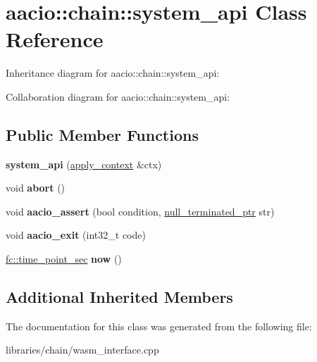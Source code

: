 \hypertarget{classaacio_1_1chain_1_1system__api}{}\section{aacio\+:\+:chain\+:\+:system\+\_\+api Class Reference}
\label{classaacio_1_1chain_1_1system__api}


Inheritance diagram for aacio\+:\+:chain\+:\+:system\+\_\+api\+:


Collaboration diagram for aacio\+:\+:chain\+:\+:system\+\_\+api\+:
\subsection*{Public Member Functions}
\begin{DoxyCompactItemize}
\item 
\mbox{\label{classaacio_1_1chain_1_1system__api_a24eb054d002c5bc73e01820f79ea032e}} 
{\bfseries system\+\_\+api} (\mbox{\hyperlink{classaacio_1_1chain_1_1apply__context}{apply\+\_\+context}} \&ctx)
\item 
\mbox{\label{classaacio_1_1chain_1_1system__api_ae9a02b9b044c0b8ecdbbb6ff7b57ec32}} 
void {\bfseries abort} ()
\item 
\mbox{\label{classaacio_1_1chain_1_1system__api_aa68ca33ae7182a31cfd49f9b86521a94}} 
void {\bfseries aacio\+\_\+assert} (bool condition, \mbox{\hyperlink{structaacio_1_1chain_1_1null__terminated__ptr}{null\+\_\+terminated\+\_\+ptr}} str)
\item 
\mbox{\label{classaacio_1_1chain_1_1system__api_ae962e75b2c05836829f4c7e4a2be97bb}} 
void {\bfseries aacio\+\_\+exit} (int32\+\_\+t code)
\item 
\mbox{\label{classaacio_1_1chain_1_1system__api_ac0d3bdd50f575d87514bd3c8af22d248}} 
\mbox{\hyperlink{classfc_1_1time__point__sec}{fc\+::time\+\_\+point\+\_\+sec}} {\bfseries now} ()
\end{DoxyCompactItemize}
\subsection*{Additional Inherited Members}


The documentation for this class was generated from the following file\+:\begin{DoxyCompactItemize}
\item 
libraries/chain/wasm\+\_\+interface.\+cpp\end{DoxyCompactItemize}
